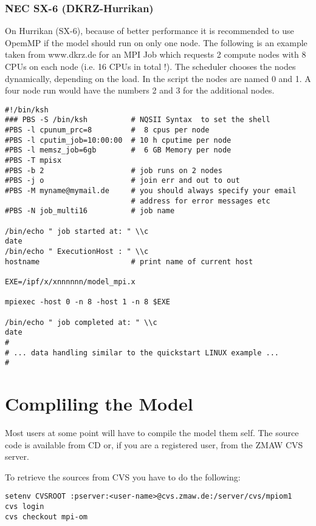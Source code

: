 \subsubsection{NEC SX-6 (DKRZ-Hurrikan)}

On Hurrikan (SX-6), because of better performance it is recommended to use OpemMP
if the model should run on only one node.
The following is an example taken from www.dkrz.de for an MPI Job which 
requests 2 compute nodes with 8 CPUs on each node (i.e. 16 CPUs in total !). 
The scheduler chooses the nodes dynamically, depending on the load. 
In the script the nodes are named 0 and 1. A four node run would have the numbers 2 and 3 for the additional nodes.
\begin{footnotesize}
\begin{verbatim}
#!/bin/ksh
### PBS -S /bin/ksh          # NQSII Syntax  to set the shell
#PBS -l cpunum_prc=8         #  8 cpus per node
#PBS -l cputim_job=10:00:00  # 10 h cputime per node
#PBS -l memsz_job=6gb        #  6 GB Memory per node
#PBS -T mpisx
#PBS -b 2                    # job runs on 2 nodes
#PBS -j o                    # join err and out to out
#PBS -M myname@mymail.de     # you should always specify your email
                             # address for error messages etc
#PBS -N job_multi16          # job name

/bin/echo " job started at: " \\c
date
/bin/echo " ExecutionHost : " \\c
hostname                     # print name of current host 

EXE=/ipf/x/xnnnnnn/model_mpi.x

mpiexec -host 0 -n 8 -host 1 -n 8 $EXE

/bin/echo " job completed at: " \\c
date
#
# ... data handling similar to the quickstart LINUX example ...
#
\end{verbatim}
\end{footnotesize}



\section{Compliling the Model}
\label{ch:using:compiling}

Most users at some point will have to compile the model them self. 
The source code is available from CD or, if you are a registered user, from the ZMAW CVS server.

To retrieve the sources from CVS you have to do the following:
\begin{footnotesize}
\begin{verbatim}
setenv CVSROOT :pserver:<user-name>@cvs.zmaw.de:/server/cvs/mpiom1
cvs login
cvs checkout mpi-om 
\end{verbatim}
\end{footnotesize}

